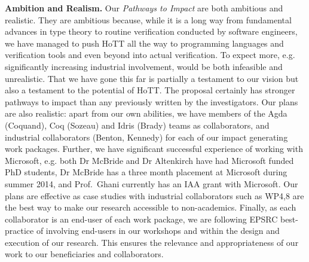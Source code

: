 \documentclass[a4paper,11pt]{article}
\begin{document}
{\bf Ambition and Realism.} Our {\em Pathways to Impact} are both
ambitious and realistic. They are ambitious because, while it is a
long way from fundamental advances in type theory to routine
verification conducted by software engineers, we have managed to push
HoTT all the way to programming languages and verification tools and
even beyond into actual verification. To expect more,
e.g. significantly increasing industrial involvement, would be both
infeasible and unrealistic. That we have gone this far is partially a
testament to our vision but also a testament to the potential of
HoTT. The proposal certainly has stronger pathways to impact than any
previously written by the investigators. Our plans are also realistic:
apart from our own abilities, we have members of the Agda (Coquand),
Coq (Sozeau) and Idris (Brady) teams as collaborators, and industrial
collaborators (Benton, Kennedy) for each of our impact generating work
packages. Further, we have significant successful experience of
working with Microsoft, e.g. both Dr McBride and Dr Altenkirch have had
Microsoft funded PhD students, Dr McBride has a three month placement
at Microsoft during summer 2014, and Prof.\ Ghani currently has an IAA
grant with Microsoft. Our plans are effective as case studies with industrial
collaborators such as WP4,8 are the best way to make our research
accessible to non-academics. Finally, as each collaborator is
an end-user of each work package, we are following EPSRC best-practice
of involving end-users in our workshops and within the 
design and execution of our research. This ensures the relevance and
appropriateness of our work to our beneficiaries and
collaborators.






\end{document}
